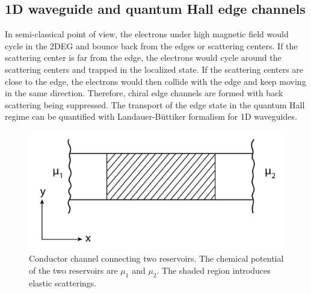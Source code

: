 \documentclass[pdflatex, sectionletters, 12pt]{pittetd}    %
\begin{document}
\subsection{1D waveguide and quantum Hall edge channels}

In semi-classical point of view, the electrons under high magnetic field would cycle in the 2DEG and bounce back from the edges or scattering centers. If the scattering center is far from the edge, the electrons would cycle around the scattering centers and trapped in the localized state. If the scattering centers are close to the edge, the electrons would then collide with the edge and keep moving in the same direction. Therefore, chiral edge channels are formed with back scattering being suppressed. The transport of the edge state in the quantum Hall regime can be quantified with Landauer-B{\"u}ttiker formalism for 1D waveguides\cite{buttiker1986four, buttiker1988absence}.
\\

\begin{figure}[h!]
	\centering
	\includegraphics[width=.5\textwidth]{Drawing/Channel.pdf}
	\caption{Conductor channel connecting two reservoirs. The chemical potential of the two reservoirs are $\mu_1$ and $\mu_2$. The shaded region introduces elastic scatterings.}
	\label{FIG:Channel}
\end{figure}
\end{document}
